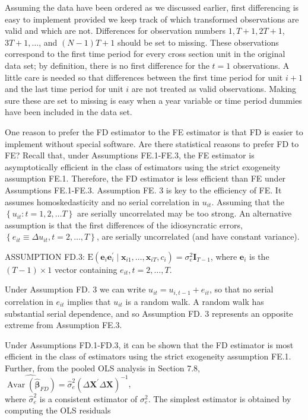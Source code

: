 \documentclass[10pt]{article}
\begin{document}
Assuming the data have been ordered as we discussed earlier, first differencing is easy to implement provided we keep track of which transformed observations are valid and which are not. Differences for observation numbers $1, T+1,2 T+1$, $3 T+1, \ldots$, and $(N-1) T+1$ should be set to missing. These observations correspond to the first time period for every cross section unit in the original data set; by definition, there is no first difference for the $t=1$ observations. A little care is needed so that differences between the first time period for unit $i+1$ and the last time period for unit $i$ are not treated as valid observations. Making sure these are set to missing is easy when a year variable or time period dummies have been included in the data set.

One reason to prefer the FD estimator to the FE estimator is that FD is easier to implement without special software. Are there statistical reasons to prefer FD to FE? Recall that, under Assumptions FE.1-FE.3, the FE estimator is asymptotically efficient in the class of estimators using the strict exogeneity assumption FE.1. Therefore, the FD estimator is less efficient than FE under Assumptions FE.1-FE.3. Assumption FE. 3 is key to the efficiency of FE. It assumes homoskedasticity and no serial correlation in $u_{i t}$. Assuming that the $\left\{u_{i t}: t=1,2, \ldots T\right\}$ are serially uncorrelated may be too strong. An alternative assumption is that the first differences of the idiosyncratic errors, $\left\{e_{i t} \equiv \Delta u_{i t}, t=2, \ldots, T\right\}$, are serially uncorrelated (and have constant variance).

ASSUMPTION FD.3: $\mathrm{E}\left(\mathbf{e}_{i} \mathbf{e}_{i}^{\prime} \mid \mathbf{x}_{i 1}, \ldots, \mathbf{x}_{i T}, c_{i}\right)=\sigma_{e}^{2} \mathbf{I}_{T-1}$, where $\mathbf{e}_{i}$ is the $(T-1) \times 1$ vector containing $e_{i t}, t=2, \ldots, T$.

Under Assumption FD. 3 we can write $u_{i t}=u_{i, t-1}+e_{i t}$, so that no serial correlation in $e_{i t}$ implies that $u_{i t}$ is a random walk. A random walk has substantial serial dependence, and so Assumption FD. 3 represents an opposite extreme from Assumption FE.3.

Under Assumptions FD.1-FD.3, it can be shown that the FD estimator is most efficient in the class of estimators using the strict exogeneity assumption FE.1. Further, from the pooled OLS analysis in Section 7.8,\\
$\widehat{\operatorname{Avar}\left(\hat{\boldsymbol{\beta}}_{F D}\right)}=\hat{\sigma}_{e}^{2}\left(\Delta \mathbf{X}^{\prime} \Delta \mathbf{X}\right)^{-1}$,\\
where $\hat{\sigma}_{e}^{2}$ is a consistent estimator of $\sigma_{e}^{2}$. The simplest estimator is obtained by computing the OLS residuals
\end{document}
